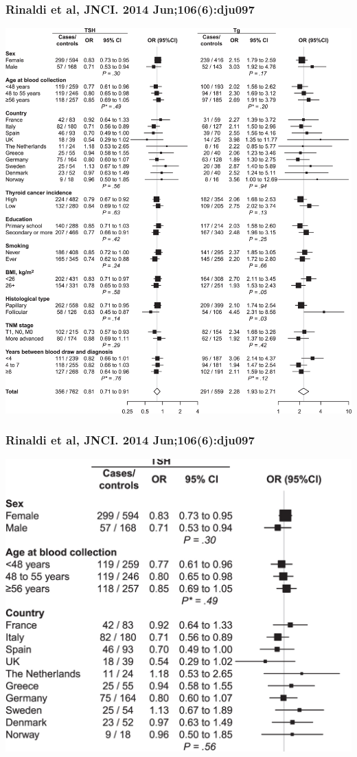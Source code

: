 \documentclass[aspectratio=169]{beamer}
\begin{document}
\begin{frame}
  \frametitle{Rinaldi et al, JNCI. 2014 Jun;106(6):dju097}

  \begin{center}
  \includegraphics[scale=0.09]{figures/thyroid.jpeg}
  \end{center}
  
\end{frame}

\begin{frame}
  \frametitle{Rinaldi et al, JNCI. 2014 Jun;106(6):dju097}

  \begin{center}
  \includegraphics[scale=0.20]{figures/thyroid-zoom.jpeg}
  \end{center}
  
\end{frame}
\end{document}
